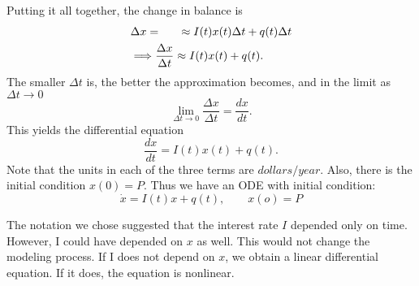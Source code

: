 Putting it all together, the change in balance is
\begin{align*}
  \displaystyle &\Delta x = \qquad \approx I(t) x(t) \Delta t + q(t) \Delta t \\
  \displaystyle &\Longrightarrow \frac{\Delta x}{\Delta t} \approx I(t) x(t) + q(t).
\end{align*}
The smaller $\Delta t$ is, the better the approximation becomes, and in the limit as $\Delta t \to 0$
\begin{equation*}
  \displaystyle  \lim \limits _{\Delta t\rightarrow 0}\frac{\Delta x}{\Delta t}=\frac{dx}{dt}.
\end{equation*}
This yields the {\color{orange} differential equation}
\begin{equation*}
  \displaystyle  \frac{dx}{dt}=I(t)x(t)+q(t).
\end{equation*}
Note that the units in each of the three terms are $dollars/year$.
Also, there is the initial condition $x(0)=P$.
Thus we have an ODE with initial condition:
\begin{equation*}
  \displaystyle \dot{x} = I(t)x + q(t), \qquad x(o) = P
\end{equation*}

\begin{remark}
  The notation we chose suggested that the interest rate $I$ depended only on time.
  However, I could have depended on $x$ as well.
  This would not change the modeling process.
  If I does not depend on $x$, we obtain a linear differential equation.
  If it does, the equation is nonlinear.
\end{remark}
\clearpage

